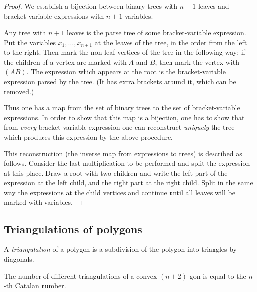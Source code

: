 \begin{page}

\begin{proof}
We establish a bijection between binary trees with $n+1$ leaves and bracket-variable expressions with $n+1$ variables.

Any tree with $n+1$ leaves is the parse tree of some bracket-variable expression.
Put the variables $x_1, \ldots, x_{n+1}$ at the leaves of the tree, in the order from the left to the right.
Then mark the non-leaf vertices of the tree in the following way:
if the children of a vertex are marked with $A$ and $B$, then mark the vertex with $(AB)$.
The expression which appears at the root is the bracket-variable expression parsed by the tree.
(It has extra brackets around it, which can be removed.)

Thus one has a map from the set of binary trees to the set of bracket-variable expressions.
In order to show that this map is a bijection, one has to show that from \emph{every} bracket-variable expression
one can reconstruct \emph{uniquely} the tree which produces this expression by the above procedure.

This reconstruction (the inverse map from expressions to trees) is described as follows.
Consider the last multiplication to be performed and split the expression at this place.
Draw a root with two children and write the left part of the expression at the left child, and the right part at the right child.
Split in the same way the expressions at the child vertices and continue until all leaves will be marked with variables.
\end{proof}




\end{page}

\begin{page}

\subsection{Triangulations of polygons}
A \emph{triangulation} of a polygon is a subdivision of the polygon into triangles by diagonals.


\end{page}

\begin{page}

\begin{thm}
The number of different triangulations of a convex $(n+2)$-gon is equal to the $n$-th Catalan number.
\end{thm}

\end{page}

